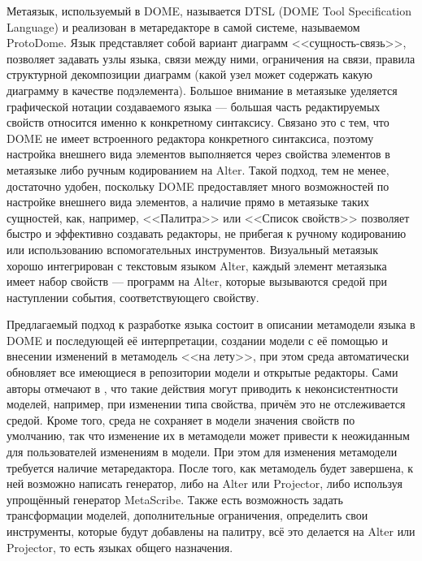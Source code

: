 Метаязык, используемый в DOME, называется DTSL (DOME Tool Specification Language) и реализован в 
метаредакторе в самой системе, называемом ProtoDome. Язык представляет собой вариант диаграмм <<сущность-связь>>, позволяет задавать узлы языка,
связи между ними, ограничения на связи, правила структурной декомпозиции диаграмм
(какой узел может содержать какую диаграмму в качестве подэлемента). Большое внимание
в метаязыке уделяется графической нотации создаваемого языка --- большая часть редактируемых свойств
относится именно к конкретному синтаксису. Связано это с тем, что DOME не имеет встроенного
редактора конкретного синтаксиса, поэтому настройка внешнего вида элементов выполняется через
свойства элементов в метаязыке либо ручным кодированием на Alter. Такой подход, тем не менее,
достаточно удобен, поскольку DOME предоставляет много возможностей по настройке внешнего вида элементов,
а наличие прямо в метаязыке таких сущностей, как, например, <<Палитра>> или <<Список свойств>> позволяет быстро
и эффективно создавать редакторы, не прибегая к ручному кодированию или использованию вспомогательных
инструментов. Визуальный метаязык хорошо интегрирован с текстовым языком Alter, каждый
элемент метаязыка имеет набор свойств --- программ на Alter, которые вызываются средой при 
наступлении события, соответствующего свойству.

Предлагаемый подход к разработке языка состоит в описании метамодели языка в DOME и последующей
её интерпретации, создании модели с её помощью и внесении изменений в метамодель <<на лету>>,
при этом среда автоматически обновляет все имеющиеся в репозитории модели и открытые редакторы.
Сами авторы отмечают в \cite{guide1999honeywell}, что такие действия могут приводить к 
неконсистентности моделей, например, при изменении типа свойства, причём это не отслеживается средой.
Кроме того, среда не сохраняет в модели значения свойств по умолчанию, так что изменение их в
метамодели может привести к неожиданным для пользователей изменениям в модели. При
этом для изменения метамодели требуется наличие метаредактора. После того, как метамодель
будет завершена, к ней возможно написать генератор, либо на Alter или Projector, либо используя
упрощённый генератор MetaScribe. Также есть возможность задать трансформации моделей, 
дополнительные ограничения, определить свои инструменты, которые будут добавлены на палитру,
всё это делается на Alter или Projector, то есть языках общего назначения.

